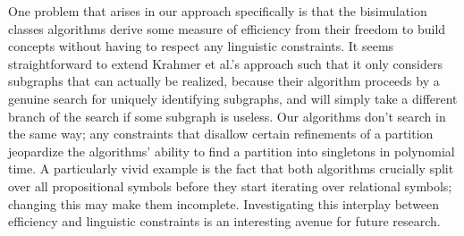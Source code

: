 One problem that arises in our approach specifically is that the
bisimulation classes algorithms derive some measure of efficiency from
their freedom to build concepts without having to respect any
linguistic constraints.  It seems straightforward to extend Krahmer et
al.'s  approach such that it only considers
subgraphs that can actually be realized, because their algorithm
proceeds by a genuine search for uniquely identifying subgraphs, and
will simply take a different branch of the search if some subgraph is
useless.  Our algorithms don't search in the same way; any constraints
that disallow certain refinements of a partition jeopardize the
algorithms' ability to find a partition into singletons in polynomial
time.  A particularly vivid example is the fact that both algorithms
crucially split over all propositional symbols before they start
iterating over relational symbols; changing this may make them
incomplete.  Investigating this interplay between efficiency and
linguistic constraints is an interesting avenue for future research.




